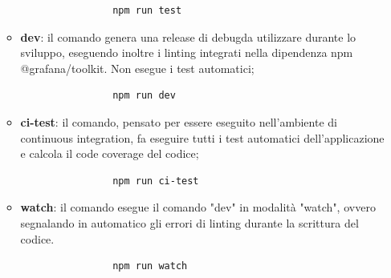 \begin{itemize}
\begin{itemize}
			\begin{verbatim}
				npm run test
			\end{verbatim}
			\item \textbf{dev}: il comando genera una release di debug\glosp da utilizzare durante lo sviluppo, eseguendo inoltre i linting integrati nella dipendenza npm @grafana/toolkit. Non esegue i test automatici;
			\begin{verbatim}
				npm run dev
			\end{verbatim}
			\item \textbf{ci-test}: il comando, pensato per essere eseguito nell'ambiente di continuous integration, fa eseguire tutti i test automatici dell'applicazione e calcola il code coverage del codice;
			\begin{verbatim}
				npm run ci-test
			\end{verbatim}
			\item \textbf{watch}: il comando esegue il comando "dev" in modalità "watch", ovvero segnalando in automatico gli errori di linting durante la scrittura del codice.
			\begin{verbatim}
				npm run watch
			\end{verbatim}
		\end{itemize}
\end{itemize}
